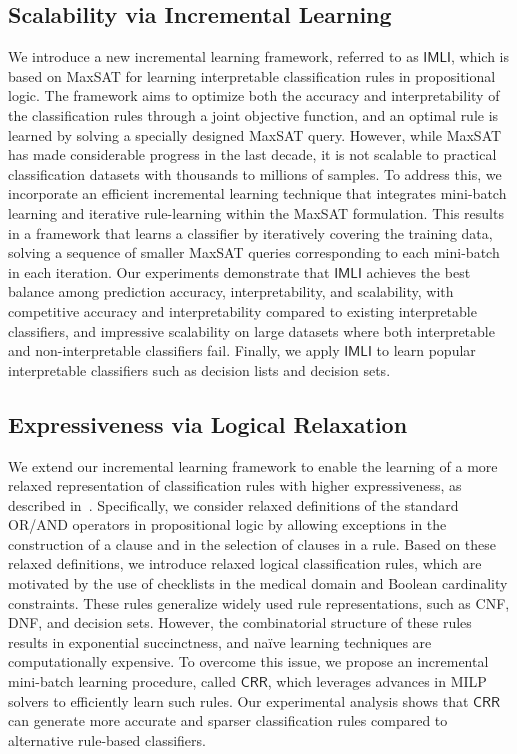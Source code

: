 \documentclass{article}
\begin{document}
\subsection*{Scalability via Incremental Learning}
We introduce a new incremental learning framework, referred to as $\mathsf{IMLI}$, which is based on MaxSAT for learning interpretable classification rules in propositional logic. The framework aims to optimize both the accuracy and interpretability of the classification rules through a joint objective function, and an optimal rule is learned by solving a specially designed MaxSAT query. However, while MaxSAT has made considerable progress in the last decade, it is not scalable to practical classification datasets with thousands to millions of samples. To address this, we incorporate an efficient incremental learning technique that integrates mini-batch learning and iterative rule-learning within the MaxSAT formulation. This results in a framework that learns a classifier by iteratively covering the training data, solving a sequence of smaller MaxSAT queries corresponding to each mini-batch in each iteration. Our experiments demonstrate that $\mathsf{IMLI}$ achieves the best balance among prediction accuracy, interpretability, and scalability, with competitive accuracy and interpretability compared to existing interpretable classifiers, and impressive scalability on large datasets where both interpretable and non-interpretable classifiers fail. Finally, we apply $\mathsf{IMLI}$ to learn popular interpretable classifiers such as decision lists and decision sets.

\subsection*{Expressiveness via Logical Relaxation}
We extend our incremental learning framework to enable the learning of a more relaxed representation of classification rules with higher expressiveness, as described in~\cite{ghosh2020classification}. Specifically, we consider relaxed definitions of the standard OR/AND operators in propositional logic by allowing exceptions in the construction of a clause and in the selection of clauses in a rule. Based on these relaxed definitions, we introduce relaxed logical classification rules, which are motivated by the use of checklists in the medical domain and Boolean cardinality constraints. These rules generalize widely used rule representations, such as CNF, DNF, and decision sets. However, the combinatorial structure of these rules results in exponential succinctness, and na\"ive learning techniques are computationally expensive. To overcome this issue, we propose an incremental mini-batch learning procedure, called $\mathsf{CRR}$, which leverages advances in MILP solvers to efficiently learn such rules. Our experimental analysis shows that $\mathsf{CRR}$ can generate more accurate and sparser classification rules compared to alternative rule-based classifiers.
\end{document}
